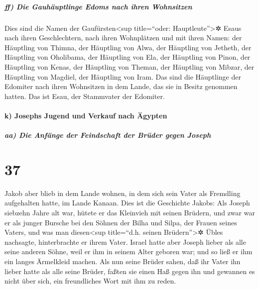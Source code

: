 \hypertarget{ff-die-gauhuxe4uptlinge-edoms-nach-ihren-wohnsitzen}{%
\subparagraph{ff) Die Gauhäuptlinge Edoms nach ihren
Wohnsitzen}\label{ff-die-gauhuxe4uptlinge-edoms-nach-ihren-wohnsitzen}}

 Dies sind die Namen der Gaufürsten\textless sup
title=``oder: Hauptleute''\textgreater✲ Esaus nach ihren Geschlechtern,
nach ihren Wohnplätzen und mit ihren Namen: der Häuptling von Thimna,
der Häuptling von Alwa, der Häuptling von Jetheth,  der
Häuptling von Oholibama, der Häuptling von Ela, der Häuptling von Pinon,
 der Häuptling von Kenas, der Häuptling von Theman, der
Häuptling von Mibzar,  der Häuptling von Magdiel, der
Häuptling von Iram. Das sind die Häuptlinge der Edomiter nach ihren
Wohnsitzen in dem Lande, das sie in Besitz genommen hatten. Das ist
Esau, der Stammvater der Edomiter.

\hypertarget{k-josephs-jugend-und-verkauf-nach-uxe4gypten}{%
\paragraph{k) Josephs Jugend und Verkauf nach
Ägypten}\label{k-josephs-jugend-und-verkauf-nach-uxe4gypten}}

\hypertarget{aa-die-anfuxe4nge-der-feindschaft-der-bruxfcder-gegen-joseph}{%
\subparagraph{aa) Die Anfänge der Feindschaft der Brüder gegen
Joseph}\label{aa-die-anfuxe4nge-der-feindschaft-der-bruxfcder-gegen-joseph}}

\hypertarget{section-36}{%
\section{37}\label{section-36}}

 Jakob aber blieb in dem Lande wohnen, in dem sich sein
Vater als Fremdling aufgehalten hatte, im Lande Kanaan. 
Dies ist die Geschichte Jakobs: Als Joseph siebzehn Jahre alt war,
hütete er das Kleinvieh mit seinen Brüdern, und zwar war er als junger
Bursche bei den Söhnen der Bilha und Silpa, der Frauen seines Vaters,
und was man diesen\textless sup title=``d.h. seinen
Brüdern''\textgreater✲ Übles nachsagte, hinterbrachte er ihrem Vater.
 Israel hatte aber Joseph lieber als alle seine anderen
Söhne, weil er ihm in seinem Alter geboren war; und so ließ er ihm ein
langes Ärmelkleid machen.  Als nun seine Brüder sahen, daß
ihr Vater ihn lieber hatte als alle seine Brüder, faßten sie einen Haß
gegen ihn und gewannen es nicht über sich, ein freundliches Wort mit ihm
zu reden.

